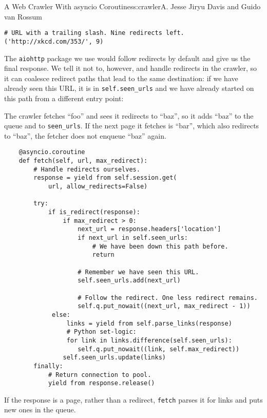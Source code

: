 \begin{aosachapter}{A Web Crawler With asyncio Coroutines}{s:crawler}{A. Jesse Jiryu Davis and Guido van Rossum}
\begin{verbatim}
# URL with a trailing slash. Nine redirects left.
('http://xkcd.com/353/', 9)
\end{verbatim}

The \texttt{aiohttp} package we use would follow redirects by default
and give us the final response. We tell it not to, however, and handle
redirects in the crawler, so it can coalesce redirect paths that lead to
the same destination: if we have already seen this URL, it is in
\texttt{self.seen\_urls} and we have already started on this path from a
different entry point:


The crawler fetches ``foo'' and sees it redirects to ``baz'', so it adds
``baz'' to the queue and to \texttt{seen\_urls}. If the next page it
fetches is ``bar'', which also redirects to ``baz'', the fetcher does
not enqueue ``baz'' again.

\begin{verbatim}
    @asyncio.coroutine
    def fetch(self, url, max_redirect):
        # Handle redirects ourselves.
        response = yield from self.session.get(
            url, allow_redirects=False)

        try:
            if is_redirect(response):
                if max_redirect > 0:
                    next_url = response.headers['location']
                    if next_url in self.seen_urls:
                        # We have been down this path before.
                        return
    
                    # Remember we have seen this URL.
                    self.seen_urls.add(next_url)
                    
                    # Follow the redirect. One less redirect remains.
                    self.q.put_nowait((next_url, max_redirect - 1))
             else:
                 links = yield from self.parse_links(response)
                 # Python set-logic:
                 for link in links.difference(self.seen_urls):
                    self.q.put_nowait((link, self.max_redirect))
                self.seen_urls.update(links)
        finally:
            # Return connection to pool.
            yield from response.release()
\end{verbatim}

If the response is a page, rather than a redirect, \texttt{fetch} parses
it for links and puts new ones in the queue.


\end{aosachapter}
